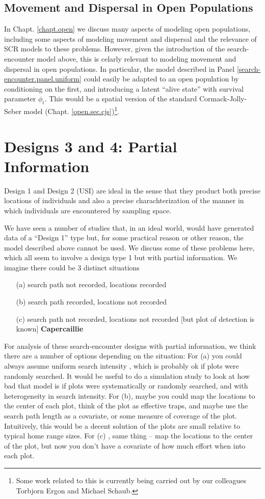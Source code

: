 \subsection{Movement and Dispersal in Open Populations}

In Chapt. \ref{chapt.open} we discuss many aspects of modeling open
populations, including some aspects of modeling movement and dispersal
and the relevance of SCR models to these problems. However, given the
introduction of the search-encounter model above, this is celarly
relevant to modeling movement and dispersal in open populations.  In
particular, the model described in Panel
\ref{search-encounter.panel.uniform} could easily be adapted to an
open population by conditioning on the first, and introducing a latent
``alive state'' with survival parameter $\phi_{t}$. This would be a
spatial version of the standard Cormack-Jolly-Seber model
(Chapt. \ref{open.sec.cjs})\footnote{Some work related to this is
  currently being carried out by our colleagues Torbjorn Ergon and
  Michael Schaub.}.

\section{Designs 3 and 4: Partial Information}


Design 1 and Design 2 (USI) are ideal in the sense that they product
both precise locations of individuals and also a precise
charachterization of the manner in which individuals are encountered
by sampling space. 

We have seen a number of studies that, in an ideal world, would have
generated data of a ``Design
1'' type but, for some practical reason or other reason, the model described
above cannot be used.
 We discuss some of these problems here, which all seem to involve a
 design type 1 but with partial information. We imagine there could be
 3 distinct situations
\begin{itemize}
\item[(a)] search path not recorded, locations recorded
\item[(b)] search path recorded, locations not recorded
\item[(c)] search path not recorded, locations not recorded [but plot of
detection is known]  {\bf Capercaillie}
\end{itemize}

For analysis of these search-encounter designs with partial information,
we think there are a number of options depending on the situation:
For (a) you could always assume uniform search intensity ,
which is probably ok if plots were randomly searched.
It would be useful to do a simulation study to look at how bad that
model is if plots were systematically or randomly searched, and with
heterogeneity in search intensity.
For (b), maybe you could map the locations to the center of each plot,
think of the plot as effective traps, and maybe use the search path
length as a covariate, or some measure of coverage of the
plot. Intuitively, this would be a decent solution of the plots are
small relative to typical home range sizes.
For (c) , same thing -- map the locations to the center of the plot,
but now you don't have a covariate of how much effort when into each
plot.



